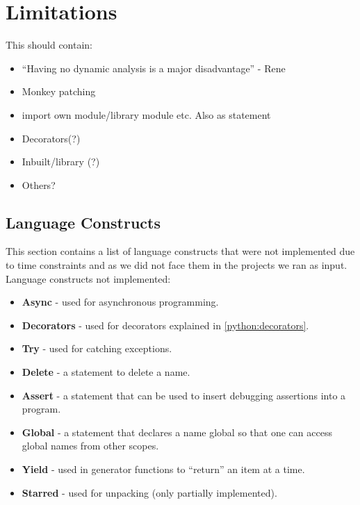 \section{Limitations}
This should contain:
\begin{itemize}
\item ``Having no dynamic analysis is a major disadvantage'' - Rene
\item Monkey patching
\item import own module/library module etc. Also as statement
\item Decorators(?)
\item Inbuilt/library (?)
\item Others?
\end{itemize}

\subsection{Language Constructs}
This section contains a list of language constructs that were not implemented due to time constraints and as we did not face them in the projects we ran as input.
Language constructs not implemented:
\begin{itemize}
\item \textbf{Async} - used for asynchronous programming.\cite{python_async}
\item \textbf{Decorators} - used for decorators explained in \cref{python:decorators}.
\item \textbf{Try} - used for catching exceptions.\cite{python_exception}
\item \textbf{Delete} - a statement to delete a name.\cite{python_delete}
\item \textbf{Assert} - a statement that can be used to insert debugging assertions into a program.\cite{python_assert}
\item \textbf{Global} - a statement that declares a name global so that one can access global names from other scopes.\cite{python_global}
\item \textbf{Yield} - used in generator functions to ``return'' an item at a time.\cite{python_yield}
\item \textbf{Starred} - used for unpacking (only partially implemented).\cite{python_unpacking}
\end{itemize}

